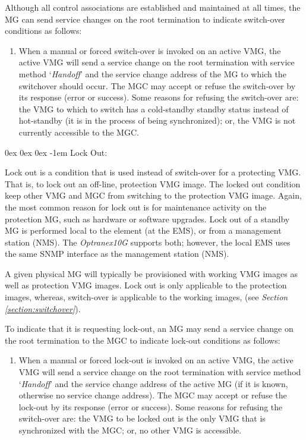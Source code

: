 \documentclass[letterpaper,final,notitlepage,twocolumn,10pt,twoside]{article}
\makeatletter
\let\normalsize = \small
\let\small = \footnotesize
\let\footnotesize = \scriptsize
\let\scriptsize = \tiny
\renewcommand\subparagraph{\@startsection{subparagraph}{5}{\parindent}%
                                       {0ex \@plus 0ex \@minus 0ex}%
                                       {-1em}%
                                      {\normalfont\normalsize\bfseries\slshape}}
\makeatother
\begin{document}
Although all control associations are established and maintained at all times,
the MG can send service changes on the root termination to indicate
switch-over conditions as follows:

\begin{enumerate}

\item When a manual or forced switch-over is invoked on an active VMG, the
active VMG will send a service change on the root termination with service
method `{\it Handoff}' and the service change address of the MG to which the
switchover should occur.  The MGC may accept or refuse the switch-over by its
response (error or success).  Some reasons for refusing the switch-over are:
the VMG to which to switch has a cold-standby standby status instead of
hot-standby (it is in the process of being synchronized); or, the VMG is not
currently accessible to the MGC.

\end{enumerate}

\subparagraph{Lock Out:}
\label{section:lockout}

Lock out is a condition that is used instead of switch-over for a protecting
VMG.  That is, to lock out an off-line, protection VMG image.  The locked out
condition keep other VMG and MGC from switching to the protection VMG image.
Again, the most common reason for lock out is for maintenance activity on the
protection MG, such as hardware or software upgrades.  Lock out of a standby
MG is performed local to the element (at the EMS), or from a management
station (NMS).  The {\sl Optranex10G} supports both; however, the local EMS
uses the same SNMP interface as the management station (NMS).

A given physical MG will typically be provisioned with working VMG images as
well as protection VMG images.  Lock out is only applicable to the protection
images, whereas, switch-over is applicable to the working images, (see {\sl
Section \ref{section:switchover}}).

To indicate that it is requesting lock-out, an MG may send a service change on
the root termination to the MGC to indicate lock-out conditions as follows:

\begin{enumerate}

\item When a manual or forced lock-out is invoked on an active VMG, the active
VMG will send a service change on the root termination with service method
`{\it Handoff}' and the service change address of the active MG (if it is
known, otherwise no service change address).  The MGC may accept or refuse the
lock-out by its response (error or success).  Some reasons for refusing the
switch-over are:  the VMG to be locked out is the only VMG that is
synchronized with the MGC; or, no other VMG is accessible.

\end{enumerate}
\end{document}
